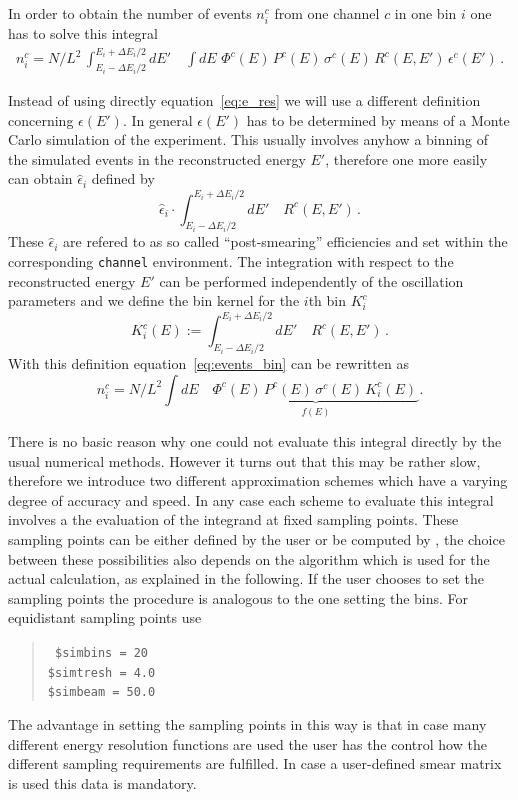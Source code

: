 In order to obtain the number of events 
$n_i^c$ from one channel $c$ in one bin $i$ one has to solve this integral
%
\begin{eqnarray}
\label{eq:events_bin}
n_i^c=N/L^2\,\int_{E_i-\Delta E_i/2}^{E_i+\Delta E_i/2} dE' 
\quad \int dE \,\, \Phi^c(E)\,
P^c(E)\,
\sigma^c(E)\,
R^c(E,E')\,
\epsilon^c(E')\,.
\end{eqnarray} 
%

Instead of using directly equation~\ref{eq:e_res} we will use a different
definition concerning $\epsilon(E')$. In general  $\epsilon(E')$ has to be
determined by means of a Monte Carlo simulation of the experiment. This
usually involves anyhow a binning of the simulated events in the reconstructed
energy $E'$, therefore one more easily can obtain  $\hat\epsilon_i$ defined
by
\begin{equation}
\label{eq:post_smearing}
\hat\epsilon_i \cdot \int_{E_i-\Delta E_i/2}^{E_i+\Delta E_i/2} dE' 
\quad R^c(E,E')\,.
\end{equation}
These  $\hat\epsilon_i$ are refered to as so called 
``post-smearing'' efficiencies and set within the corresponding {\tt channel}
environment.
The integration with respect to the reconstructed energy $E'$ can be
performed independently of the oscillation parameters and we define
the bin kernel for the $i$th bin $K_i^c$
\begin{equation}
\label{eq:kernel}
K_i^c(E):=\int_{E_i-\Delta E_i/2}^{E_i+\Delta E_i/2} dE' 
\quad R^c(E,E')\,.
\end{equation}
With this definition equation~\ref{eq:events_bin} can be rewritten as
\begin{equation}
\label{eq:simple_int}
n_i^c=N/L^2 \int dE\quad  \underbrace{\Phi^c(E)\,
P^c(E)\,
\sigma^c(E)\,
K_i^c(E)\,}_{f(E)}. 
\end{equation}

There is no basic reason why one could not evaluate this integral directly
by the usual numerical methods. However it turns out that this may be rather
slow, therefore we introduce two different approximation schemes which have
a varying degree of accuracy and speed. In any case each scheme to evaluate this
integral involves a the evaluation of the integrand at fixed sampling points.
These sampling points can be either defined by the user or be computed by
\GLOBES, the choice between these possibilities also depends on the algorithm
which is used for the actual calculation, as explained in the following.
If the user chooses to set the sampling points the procedure is analogous
to the one setting the bins. For equidistant sampling points use
\begin{quote}
{\tt
\$simbins = 20\\
\$simtresh =          4.0\\
\$simbeam =         50.0
}
\end{quote}
The advantage in setting the sampling points in this way is that in case many
different energy resolution functions are used the user has the control
how the different sampling requirements are fulfilled. In case a user-defined
smear matrix is used this data is mandatory.

